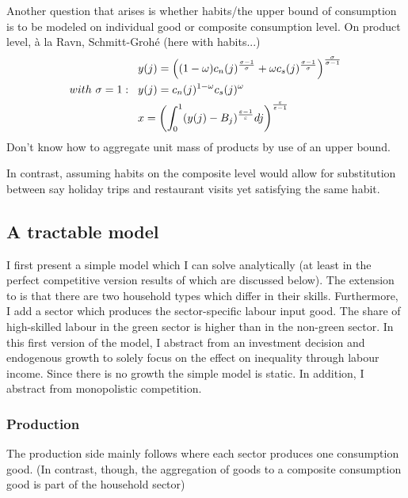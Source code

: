 Another question that arises is whether habits/the upper bound of consumption is to be modeled on individual good or composite consumption level.
On product level, à la Ravn, Schmitt-Grohé (here with habits...)
\begin{align*}
&y(j)=\left((1-\omega)c_n(j)^{\frac{\sigma-1}{\sigma}} +\omega c_s(j)^{\frac{\sigma-1}{\sigma}}\right)^\frac{\sigma}{\sigma-1}\\
with\ \sigma =1: \hspace{3mm}& y(j)=c_n(j)^{1-\omega}c_s(j)^\omega \\
&	x= \left(\int_{0}^{1} (y(j)- B_j)^{\frac{\varepsilon-1}{\varepsilon}}dj\right)^{\frac{\varepsilon}{\varepsilon-1}}
\end{align*}
Don't know how to aggregate unit mass of products by use of an upper bound. 

In contrast, assuming habits on the composite level would allow for substitution between say holiday trips and restaurant visits yet satisfying the same habit.

\subsection{A tractable model}\label{subsec:Simplemodel}
I first present a simple model which I can solve analytically (at least in the perfect competitive version results of which are discussed below). The extension to \cite{Acemoglu2012TheChange} is that there are two household types which differ in their skills. Furthermore, I add a sector which produces the sector-specific labour input good. The share of high-skilled labour in the green sector is higher than in the non-green sector. In this first version of the model, I abstract from an investment decision and endogenous growth to solely focus on the effect on inequality through labour income. Since there is no growth the simple model is static. In addition, I abstract from monopolistic competition.

\subsubsection{Production}
The production side mainly follows \cite{Acemoglu2012TheChange} where each sector produces one consumption good. (In contrast, though, the aggregation of goods to a composite consumption good is part of the household sector) \\


